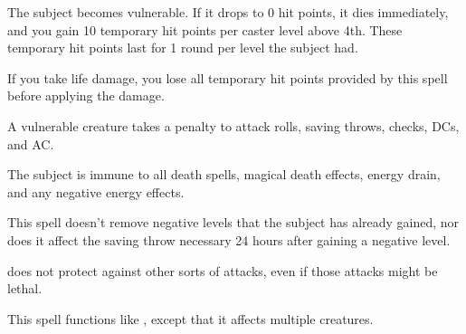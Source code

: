 \spellrng{\rngmed}
\begin{spellblood}
  The subject becomes vulnerable. If it drops to 0 hit points, it dies immediately, and you gain 10 temporary hit points  per caster level above 4th. These temporary hit points last for 1 round per level the subject had.

 If you take life damage, you lose all temporary hit points provided by this spell before applying the damage.
\end{spellblood}
\begin{spellnotes}
  A vulnerable creature takes a  penalty to attack rolls, saving throws, checks, DCs, and AC.
\end{spellnotes}

\spellrng{\rngclose}
\spelldur{\durshort}
\begin{spelleffect}
  The subject is immune to all death spells, magical death effects, energy drain, and any negative energy effects.
\end{spelleffect}
\begin{spellnotes}
  This spell doesn't remove negative levels that the subject has already gained, nor does it affect the saving throw necessary 24 hours after gaining a negative level.
  \par {} does not protect against other sorts of attacks, even if those attacks might be lethal.
\end{spellnotes}

\spellrng{\rngmed}
\begin{spelleffect}
  This spell functions like , except that it affects multiple creatures.
\end{spelleffect}

